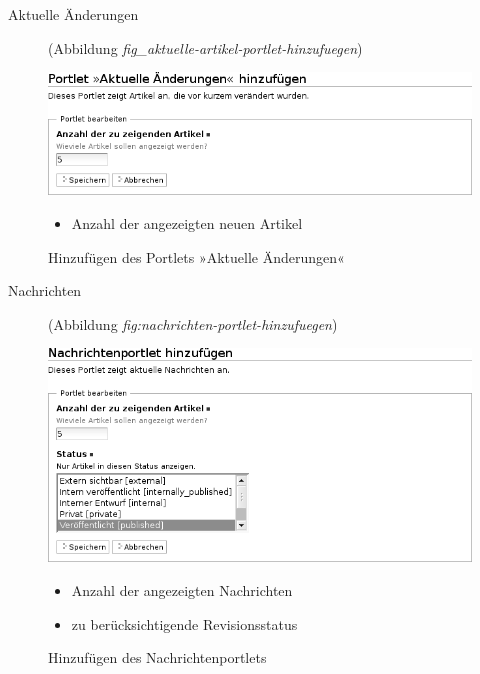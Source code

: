 \documentclass[a4paper,12pt,ngerman]{manual}
\begin{document}
\begin{description}
\item[Aktuelle Änderungen] \leavevmode
(Abbildung \emph{fig\_aktuelle-artikel-portlet-hinzufuegen})

\end{description}
\begin{figure}[htbp]
\centering

\includegraphics{aktuelle-artikel-portlet-hinzufuegen.png}
\caption{Hinzufügen des Portlets »Aktuelle Änderungen«}{\small \begin{itemize}
\item {} 
Anzahl der angezeigten neuen Artikel

\end{itemize}
}\end{figure}
\begin{description}
\item[Nachrichten] \leavevmode
(Abbildung \emph{fig:nachrichten-portlet-hinzufuegen})

\end{description}
\hypertarget{fig-nachrichten-portlet-hinzufuegen}{}\begin{figure}[htbp]
\centering

\includegraphics{nachrichten-portlet-hinzufuegen.png}
\caption{Hinzufügen des Nachrichtenportlets}{\small \begin{itemize}
\item {} 
Anzahl der angezeigten Nachrichten

\item {} 
zu berücksichtigende Revisionsstatus

\end{itemize}
}\end{figure}
\end{document}
